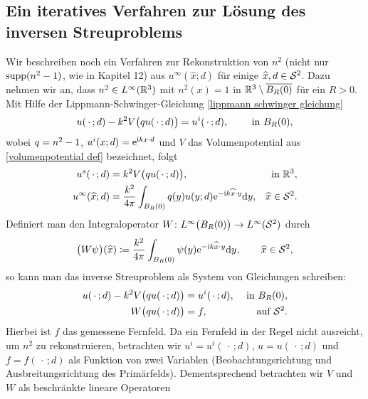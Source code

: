 \setcounter{subsection}{12}
\setcounter{section}{13}
\setcounter{mydef}{0}
\setcounter{equation}{0}

\subsection{Ein iteratives Verfahren zur Lösung des inversen Streuproblems}
Wir beschreiben noch ein Verfahren zur Rekonstruktion von \(n^2\) (nicht nur \(\operatorname{supp}(n^2-1)\), wie in Kapitel 12) aus \(u^\infty(\widehat{x};d)\) für einige \(\widehat{x},d\in\mathcal{S}^2\). Dazu nehmen wir an, dass \(n^2\in L^\infty(\mathbb{R}^3)\) mit \(n^2(x)=1\) in \(\mathbb{R}^3\setminus\overline{B_R(0)}\) für ein \(R>0\). Mit Hilfe der Lippmann-Schwinger-Gleichung \eqref{lippmann schwinger gleichung}
\begin{equation*}
	u(\,\cdot\,;d)-k^2V\big(q u(\,\cdot\,;d)\big)=u^i(\,\cdot\,;d),\qquad\text{ in }B_R(0),
\end{equation*}
wobei \(q=n^2-1\), \(u^i(x;d)=\mathrm{e}^{\mathrm{i} kx\cdot d}\) und \(V\) das Volumenpotential aus \eqref{volumenpotential def} bezeichnet, folgt
\begin{equation}
	\label{fernfeld zur berechnung von n^2}
	\begin{aligned}
		u^s(\,\cdot\,;d)&=k^2V\big(q u(\,\cdot\,;d)\big),&\text{ in }\mathbb{R}^3,\\
		u^\infty(\widehat{x};d)&=\frac{k^2}{4\pi}\int_{B_R(0)}q(y)u(y;d)\mathrm{e}^{-\mathrm{i} k\widehat{x}\cdot y}\mathrm{d}y,&\widehat{x}\in\mathcal{S}^2.
	\end{aligned}
\end{equation}
Definiert man den Integraloperator \(W\colon L^\infty\big(B_R(0)\big) \to L^\infty(\mathcal{S}^2)\) durch
\begin{equation}
	\label{definition integraloperator W}
	\big(W\psi\big)(\widehat{x})\coloneqq\frac{k^2}{4\pi}\int_{B_R(0)}\psi(y)\mathrm{e}^{-\mathrm{i} k\widehat{x}\cdot y}\mathrm{d}y,\qquad\widehat{x}\in\mathcal{S}^2,
\end{equation}
so kann man das inverse Streuproblem als System von Gleichungen schreiben:
\begin{equation}
	\label{inverses streuproblem als system von gleichungen}
	\begin{aligned}
		u(\,\cdot\,;d)-k^2V\big(q u(\,\cdot\,;d)\big) & =u^i(\,\cdot\,;d), & \text{ in }B_R(0),\\
		W\big(q u(\,\cdot\,;d)\big) & =f, & \text{ auf }\mathcal{S}^2.
	\end{aligned}
\end{equation}
Hierbei ist \(f\) das \glqq{}gemessene\grqq{} Fernfeld. Da ein Fernfeld in der Regel nicht ausreicht, um \(n^2\) zu rekonstruieren, betrachten wir \(u^i=u^i(\,\cdot\,;d)\), \(u=u(\,\cdot\,;d)\) und \(f=f(\,\cdot\,;d)\) als Funktion von zwei Variablen (Beobachtungsrichtung und Ausbreitungsrichtung des Primärfelds). Dementsprechend betrachten wir \(V\) und \(W\) als beschränkte lineare Operatoren
